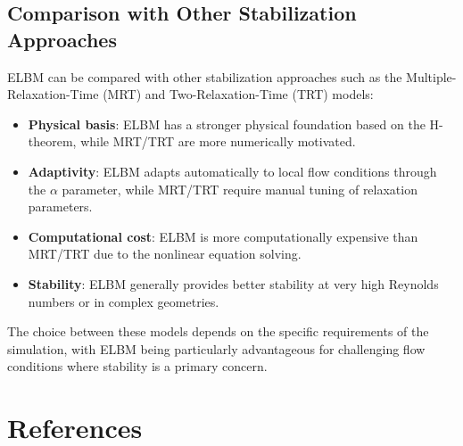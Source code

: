 \documentclass[12pt,a4paper]{article}
\begin{document}
\subsection{Comparison with Other Stabilization Approaches}

ELBM can be compared with other stabilization approaches such as the Multiple-Relaxation-Time (MRT) and Two-Relaxation-Time (TRT) models:

\begin{itemize}
    \item \textbf{Physical basis}: ELBM has a stronger physical foundation based on the H-theorem, while MRT/TRT are more numerically motivated.

    \item \textbf{Adaptivity}: ELBM adapts automatically to local flow conditions through the $\alpha$ parameter, while MRT/TRT require manual tuning of relaxation parameters.

    \item \textbf{Computational cost}: ELBM is more computationally expensive than MRT/TRT due to the nonlinear equation solving.

    \item \textbf{Stability}: ELBM generally provides better stability at very high Reynolds numbers or in complex geometries.
\end{itemize}

The choice between these models depends on the specific requirements of the simulation, with ELBM being particularly advantageous for challenging flow conditions where stability is a primary concern.

\section{References}


\end{document}
